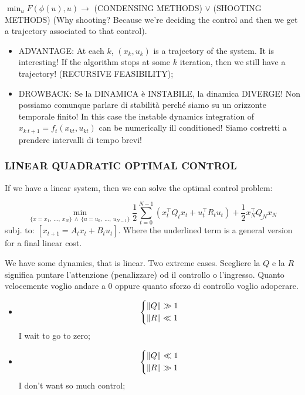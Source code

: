 $\min_u{F(\phi(u),u)} \rightarrow$ (CONDENSING METHODS) $\lor$ (SHOOTING METHODS) (Why shooting?  Because we're deciding the control and then we get a trajectory associated to that control).

\begin{itemize}
\item{ADVANTAGE}: At each $k$, $(x_k,u_k)$ is a trajectory of the system. It is interesting! If the algorithm stops at some $k$ iteration, then we still have a trajectory! (RECURSIVE FEASIBILITY);
\item{DROWBACK}: Se la DINAMICA è INSTABILE, la dinamica DIVERGE! Non possiamo comunque parlare di stabilità perché siamo su un orizzonte temporale finito! In this case the instable dynamics integration of $x_{k\ t+1}=f_t(x_{kt},u_{kt})$ can be numerically ill conditioned! Siamo costretti a prendere intervalli di tempo brevi!
\end{itemize}

\subsubsection{LINEAR QUADRATIC OPTIMAL CONTROL}

If we have a linear system, then we can solve the optimal control problem:

\[
	\min_{\{x=x_1,\ \dots,\ x_N\}\ \land\ \{u=u_0,\ \dots,\ u_{N-1}\}}{\frac{1}{2}\sum_{t=0}^{N-1}{(x_t^\top Q_tx_t + u_t^\top R_tu_t)} + \frac{1}{2}\underline{x_N^\top Q_Nx_N}}
\]
subj. to: $[x_{t+1} = A_tx_t + B_tu_t]$. Where the underlined term is a general version for a final linear cost.

We have some dynamics, that is linear. Two extreme cases. Scegliere la $Q$ e la $R$ significa puntare l'attenzione (penalizzare) od il controllo o l'ingresso. Quanto velocemente voglio andare a 0 oppure quanto sforzo di controllo voglio adoperare.
\begin{itemize}
\item
\[ 
	\left\{
	\begin{aligned}
	&\lVert Q\rVert \gg 1\\
	&\lVert R\rVert \ll 1
	\end{aligned}
	\right.
\]
I wait to go to zero;
\item
\[ 
	\left\{
	\begin{aligned}
	&\lVert Q\rVert \ll 1\\
	&\lVert R\rVert \gg 1
	\end{aligned}
	\right.
\]
I don't want so much control;
\end{itemize}

